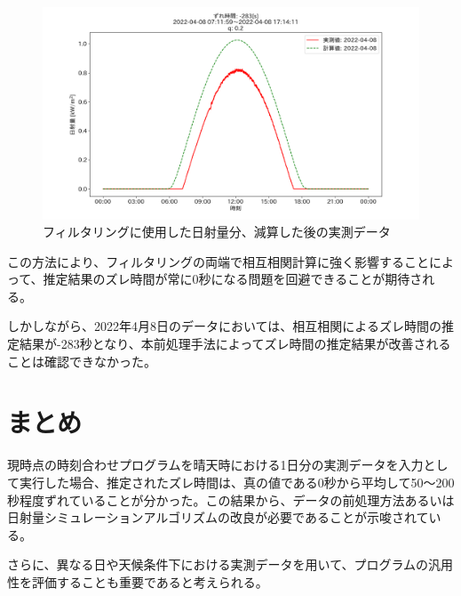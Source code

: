 \documentclass[a4j,12pt,]{jarticle}
\begin{document}
\begin{figure}[H]
  \begin{center}
    \includegraphics[width=160mm]{2022-04-08_mask_by_q_corr.png}
    \caption{フィルタリングに使用した日射量分、減算した後の実測データ}
    \label{p10}
  \end{center}
\end{figure}

この方法により、フィルタリングの両端で相互相関計算に強く影響することによって、推定結果のズレ時間が常に0秒になる問題を回避できることが期待される。

しかしながら、2022年4月8日のデータにおいては、相互相関によるズレ時間の推定結果が-283秒となり、本前処理手法によってズレ時間の推定結果が改善されることは確認できなかった。

\section{まとめ}
現時点の時刻合わせプログラムを晴天時における1日分の実測データを入力として実行した場合、推定されたズレ時間は、真の値である0秒から平均して50〜200秒程度ずれていることが分かった。この結果から、データの前処理方法あるいは日射量シミュレーションアルゴリズムの改良が必要であることが示唆されている。

さらに、異なる日や天候条件下における実測データを用いて、プログラムの汎用性を評価することも重要であると考えられる。
\end{document}
